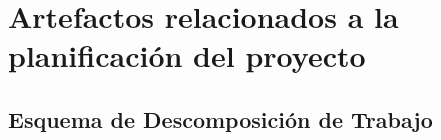 \chapter{Artefactos relacionados a la planificación del proyecto}
\section{Esquema de Descomposición de Trabajo}

\cleardoublepage